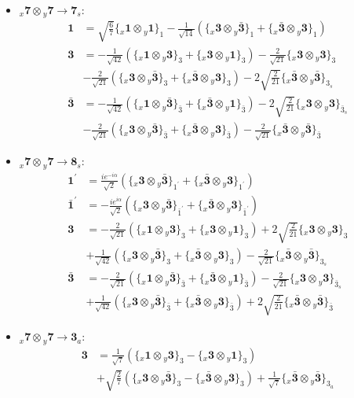 \documentclass[english]{article}
\newcommand{\rep}[1]{\mathbf{#1}}
\newcommand{\repx}[2]{{}_{#2}\mathbf{#1}}
\newcommand{\subcg}[3]{\big\{ \repx{#1}{x}\otimes\repx{#2}{y}\big\}^{}_{#3}}
\begin{document}
\begin{itemize}
\begin{align*}
\end{align*}
\item $\repx{7}{x}\otimes\repx{7}{y}\to\rep{7}_{s}$:
\begin{align*}
\rep{1} & = \sqrt{\frac{6}{7}}\subcg{1}{1}{1}-\frac{1}{\sqrt{14}}\left(\subcg{3}{\bar{3}}{1}+\subcg{\bar{3}}{3}{1}\right)
\\
\rep{3} & = -\frac{1}{\sqrt{42}}\left(\subcg{1}{3}{3}+\subcg{3}{1}{3}\right)-\frac{2}{\sqrt{21}}\subcg{3}{3}{3} \\ 
 & -\frac{2}{\sqrt{21}}\left(\subcg{3}{\bar{3}}{3}+\subcg{\bar{3}}{3}{3}\right)-2 \sqrt{\frac{2}{21}}\subcg{\bar{3}}{\bar{3}}{3_{s}}
\\
\rep{\bar{3}} & = -\frac{1}{\sqrt{42}}\left(\subcg{1}{\bar{3}}{\bar{3}}+\subcg{\bar{3}}{1}{\bar{3}}\right)-2 \sqrt{\frac{2}{21}}\subcg{3}{3}{\bar{3}_{s}} \\ 
 & -\frac{2}{\sqrt{21}}\left(\subcg{3}{\bar{3}}{\bar{3}}+\subcg{\bar{3}}{3}{\bar{3}}\right)-\frac{2}{\sqrt{21}}\subcg{\bar{3}}{\bar{3}}{\bar{3}}
\end{align*}
\item $\repx{7}{x}\otimes\repx{7}{y}\to\rep{8}_{s}$:
\begin{align*}
\rep{1^{\prime}} & = \frac{i e^{-i \alpha }}{\sqrt{2}}\left(\subcg{3}{\bar{3}}{1^{\prime}}+\subcg{\bar{3}}{3}{1^{\prime}}\right)
\\
\rep{\bar{1}^{\prime}} & = -\frac{i e^{i \alpha }}{\sqrt{2}}\left(\subcg{3}{\bar{3}}{\bar{1}^{\prime}}+\subcg{\bar{3}}{3}{\bar{1}^{\prime}}\right)
\\
\rep{3} & = -\frac{2}{\sqrt{21}}\left(\subcg{1}{3}{3}+\subcg{3}{1}{3}\right)+2 \sqrt{\frac{2}{21}}\subcg{3}{3}{3} \\ 
 & +\frac{1}{\sqrt{42}}\left(\subcg{3}{\bar{3}}{3}+\subcg{\bar{3}}{3}{3}\right)-\frac{2}{\sqrt{21}}\subcg{\bar{3}}{\bar{3}}{3_{s}}
\\
\rep{\bar{3}} & = -\frac{2}{\sqrt{21}}\left(\subcg{1}{\bar{3}}{\bar{3}}+\subcg{\bar{3}}{1}{\bar{3}}\right)-\frac{2}{\sqrt{21}}\subcg{3}{3}{\bar{3}_{s}} \\ 
 & +\frac{1}{\sqrt{42}}\left(\subcg{3}{\bar{3}}{\bar{3}}+\subcg{\bar{3}}{3}{\bar{3}}\right)+2 \sqrt{\frac{2}{21}}\subcg{\bar{3}}{\bar{3}}{\bar{3}}
\end{align*}
\item $\repx{7}{x}\otimes\repx{7}{y}\to\rep{3}_{a}$:
\begin{align*}
\rep{3} & = \frac{1}{\sqrt{7}}\left(\subcg{1}{3}{3}-\subcg{3}{1}{3}\right) \\ 
 & +\sqrt{\frac{2}{7}}\left(\subcg{3}{\bar{3}}{3}-\subcg{\bar{3}}{3}{3}\right)+\frac{1}{\sqrt{7}}\subcg{\bar{3}}{\bar{3}}{3_{a}}

\end{align*}
\end{itemize}
\end{document}
